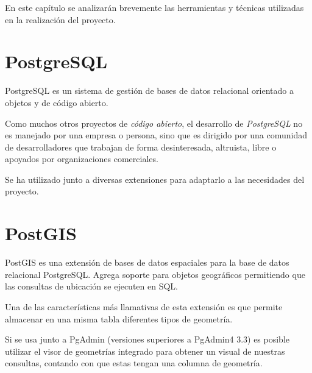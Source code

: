 
En este capítulo se analizarán brevemente las herramientas y técnicas utilizadas en la realización del proyecto.

\section{PostgreSQL}
PostgreSQL es un sistema de gestión de bases de datos relacional orientado a objetos y de código abierto.

Como muchos otros proyectos de \textit{código abierto}, el desarrollo de \textit{PostgreSQL} no es manejado por una empresa o persona, sino que es dirigido por una comunidad de desarrolladores que trabajan de forma desinteresada, altruista, libre o apoyados por organizaciones comerciales.\cite{wiki:postgresql}

Se ha utilizado junto a diversas extensiones para adaptarlo a las necesidades del proyecto.

\section{PostGIS}
PostGIS es una extensión de bases de datos espaciales para la base de datos relacional PostgreSQL. Agrega soporte para objetos geográficos permitiendo que las consultas de ubicación se ejecuten en SQL.
\cite{manual:postgis}

Una de las características más llamativas de esta extensión es que permite almacenar en una misma tabla diferentes tipos de geometría.

Si se usa junto a PgAdmin (versiones superiores a PgAdmin4 3.3) es posible utilizar el visor de geometrías integrado para obtener un visual de nuestras consultas, contando con que estas tengan una columna de geometría.

